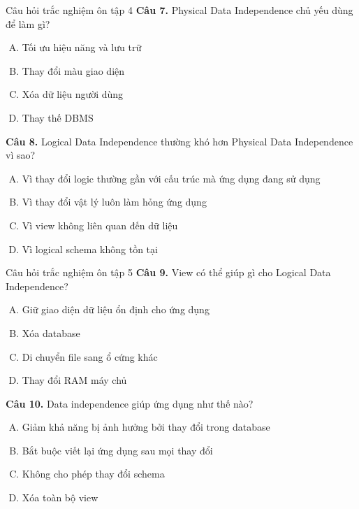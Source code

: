 \documentclass[aspectratio=169,11pt]{beamer}
\begin{document}
\begin{frame}{Câu hỏi trắc nghiệm ôn tập 4}
\small
\textbf{Câu 7.} Physical Data Independence chủ yếu dùng để làm gì?
\begin{enumerate}[A.]
  \item Tối ưu hiệu năng và lưu trữ
  \item Thay đổi màu giao diện
  \item Xóa dữ liệu người dùng
  \item Thay thế DBMS
\end{enumerate}

\textbf{Câu 8.} Logical Data Independence thường khó hơn Physical Data Independence vì sao?
\begin{enumerate}[A.]
  \item Vì thay đổi logic thường gần với cấu trúc mà ứng dụng đang sử dụng
  \item Vì thay đổi vật lý luôn làm hỏng ứng dụng
  \item Vì view không liên quan đến dữ liệu
  \item Vì logical schema không tồn tại
\end{enumerate}
\end{frame}

\begin{frame}{Câu hỏi trắc nghiệm ôn tập 5}
\small
\textbf{Câu 9.} View có thể giúp gì cho Logical Data Independence?
\begin{enumerate}[A.]
  \item Giữ giao diện dữ liệu ổn định cho ứng dụng
  \item Xóa database
  \item Di chuyển file sang ổ cứng khác
  \item Thay đổi RAM máy chủ
\end{enumerate}

\textbf{Câu 10.} Data independence giúp ứng dụng như thế nào?
\begin{enumerate}[A.]
  \item Giảm khả năng bị ảnh hưởng bởi thay đổi trong database
  \item Bắt buộc viết lại ứng dụng sau mọi thay đổi
  \item Không cho phép thay đổi schema
  \item Xóa toàn bộ view
\end{enumerate}
\end{frame}
\end{document}
